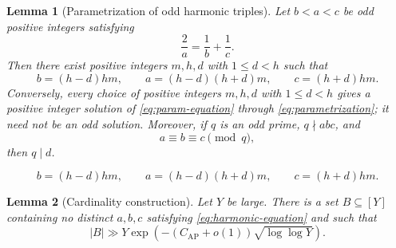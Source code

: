 \documentclass[10pt,a4paper]{amsart}
\newtheorem{lemma}{Lemma}
\newcommand{\AP}{\mathrm{AP}}
\begin{document}
\begin{lemma}[Parametrization of odd harmonic triples]\label{lem:parametrization}
Let $b<a<c$ be odd positive integers satisfying
\begin{equation}\label{eq:param-equation}
  \frac2a=\frac1b+\frac1c .
\end{equation}
Then there exist positive integers $m,h,d$ with $1\le d<h$ such that
\begin{equation}\label{eq:parametrization}
  b=(h-d)hm,\qquad a=(h-d)(h+d)m,\qquad c=(h+d)hm .
\end{equation}
Conversely, every choice of positive integers $m,h,d$ with $1\le d<h$ gives a positive integer solution of \eqref{eq:param-equation} through \eqref{eq:parametrization}; it need not be an odd solution.  Moreover, if $q$ is an odd prime, $q\nmid abc$, and
\begin{equation}\label{eq:equal-congruence-param}
  a\equiv b\equiv c\pmod q,
\end{equation}
then $q\mid d$.
\end{lemma}

\begin{equation}
  b=(h-d)hm,\qquad a=(h-d)(h+d)m,\qquad c=(h+d)hm .
\end{equation}

\begin{lemma}[Cardinality construction]\label{lem:cardinality-core}
Let $Y$ be large.  There is a set $B\subseteq [Y]$ containing no distinct $a,b,c$ satisfying \eqref{eq:harmonic-equation} and such that
\begin{equation}\label{eq:core-cardinality}
  |B|
  \gg
  Y\exp\!\left(-(C_{\AP}+o(1))\sqrt{\log\log Y}\right).
\end{equation}
\end{lemma}
\end{document}
